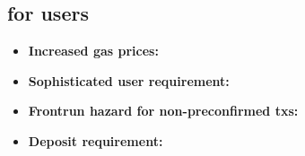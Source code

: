 \documentclass[a4paper]{article}
\theoremstyle{boldstyle}
\begin{document}
    \subsection{for users}

    \begin{itemize}
        \item \textbf{Increased gas prices:} 
        
        \item \textbf{Sophisticated user requirement:} %
        
        \item \textbf{Frontrun hazard for non-preconfirmed txs:} %
        
        \item \textbf{Deposit requirement:} 
    \end{itemize}
    
\end{document}
